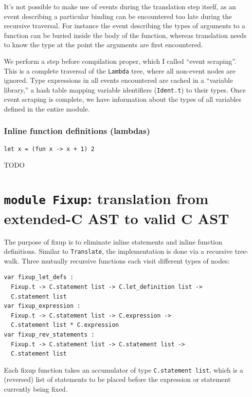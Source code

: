 \documentclass[12pt,a4paper,twoside,openright]{report}
\begin{document}
It's not possible to make use of events during the translation step itself,
as an event describing a particular binding can be encountered too late during
the recursive traversal. For instance the event describing the types of arguments
to a function can be buried inside the body of the function, whereas
translation needs to know the type at the point the arguments are first encountered.

We perform a step before compilation proper, which I called ``event scraping''.
This is a complete traversal of the \lstinline!Lambda! tree, where all non-event
nodes are ignored. Type expressions in all events encountered are cached in a
``variable library,'' a hash table mapping variable identifiers
(\lstinline!Ident.t!) to their types. Once event scraping is complete, we have
information about the types of all variables defined in the entire module.

\subsubsection{Inline function definitions (lambdas)}\label{c-inline-functions}

\begin{lstlisting}
let x = (fun x -> x + 1) 2
\end{lstlisting}

TODO

\section{\texttt{module Fixup}: translation from extended-C AST to valid C AST}\label{module-fixup}

The purpose of fixup is to eliminate inline statements and inline function
definitions. Similar to \lstinline!Translate!, the implementation is done via a
recursive tree-walk. Three mutually recursive functions each visit
different types of nodes:

\begin{lstlisting}
var fixup_let_defs :
  Fixup.t -> C.statement list -> C.let_definition list ->
  C.statement list
var fixup_expression :
  Fixup.t -> C.statement list -> C.expression ->
  C.statement list * C.expression
var fixup_rev_statements :
  Fixup.t -> C.statement list -> C.statement list ->
  C.statement list
\end{lstlisting}

Each fixup function takes an accumulator of type \lstinline!C.statement list!,
which is a (reversed) list of statements to be placed before the expression or
statement currently being fixed.
\end{document}
